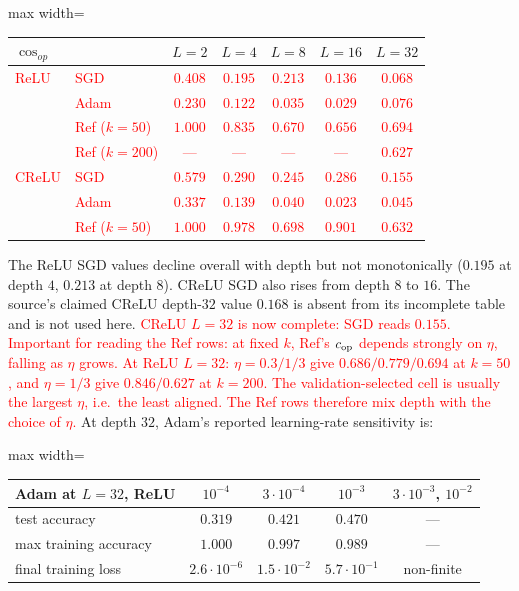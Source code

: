 \documentclass{article}
\newcommand{\nat}[1]{\textcolor{red}{#1}}
\theoremstyle{definition}
\theoremstyle{remark}
\begin{document}
\begin{center}\small
\begin{adjustbox}{max width=\linewidth}
\begin{tabular}{llccccc}
\toprule
$\cos_{op}$ & & $L=2$ & $L=4$ & $L=8$ & $L=16$ & $L=32$ \\
\midrule
\nat{ReLU} & \nat{SGD} & \nat{$0.408$} & \nat{$0.195$} & \nat{$0.213$} & \nat{$0.136$} & \nat{$0.068$} \\
      & \nat{Adam} & \nat{$0.230$} & \nat{$0.122$} & \nat{$0.035$} & \nat{$0.029$} & \nat{$0.076$} \\
      & \nat{Ref ($k{=}50$)} & \nat{$1.000$} & \nat{$0.835$} & \nat{$0.670$} & \nat{$0.656$} & \nat{$0.694$} \\
      & \nat{Ref ($k{=}200$)} & \nat{---} & \nat{---} & \nat{---} & \nat{---} & \nat{$0.627$} \\
\midrule
\nat{CReLU} & \nat{SGD} & \nat{$0.579$} & \nat{$0.290$} & \nat{$0.245$} & \nat{$0.286$} & \nat{$0.155$} \\
      & \nat{Adam} & \nat{$0.337$} & \nat{$0.139$} & \nat{$0.040$} & \nat{$0.023$} & \nat{$0.045$} \\
      & \nat{Ref ($k{=}50$)} & \nat{$1.000$} & \nat{$0.978$} & \nat{$0.698$} & \nat{$0.901$} & \nat{$0.632$} \\
\bottomrule
\end{tabular}
\end{adjustbox}
\end{center}

The ReLU SGD values decline overall with depth but not monotonically ($0.195$ at depth $4$, $0.213$ at depth $8$). CReLU SGD also rises from depth $8$ to $16$. The source's claimed CReLU depth-$32$ value $0.168$ is absent from its incomplete table and is not used here. \nat{CReLU $L{=}32$ is now complete: SGD reads $0.155$. Important for reading the Ref rows: at fixed $k$, Ref's $c_{\rm op}$ depends strongly on $\eta$, falling as $\eta$ grows. At ReLU $L{=}32$: $\eta=0.3/1/3$ give $0.686/0.779/0.694$ at $k=50$, and $\eta=1/3$ give $0.846/0.627$ at $k=200$. The validation-selected cell is usually the largest $\eta$, i.e.\ the least aligned. The Ref rows therefore mix depth with the choice of $\eta$.} At depth $32$, Adam's reported learning-rate sensitivity is:

\begin{center}\small
\begin{adjustbox}{max width=\linewidth}
\begin{tabular}{lcccc}
\toprule
Adam at $L=32$, ReLU & $10^{-4}$ & $3\cdot10^{-4}$ & $10^{-3}$ & $3\cdot10^{-3}$, $10^{-2}$ \\
\midrule
test accuracy         & $0.319$ & $0.421$ & $\mathbf{0.470}$ & --- \\
max training accuracy & $1.000$ & $0.997$ & $0.989$ & --- \\
final training loss   & $2.6\cdot10^{-6}$ & $1.5\cdot10^{-2}$ & $5.7\cdot10^{-1}$ & non-finite \\
\bottomrule
\end{tabular}
\end{adjustbox}
\end{center}
\end{document}
